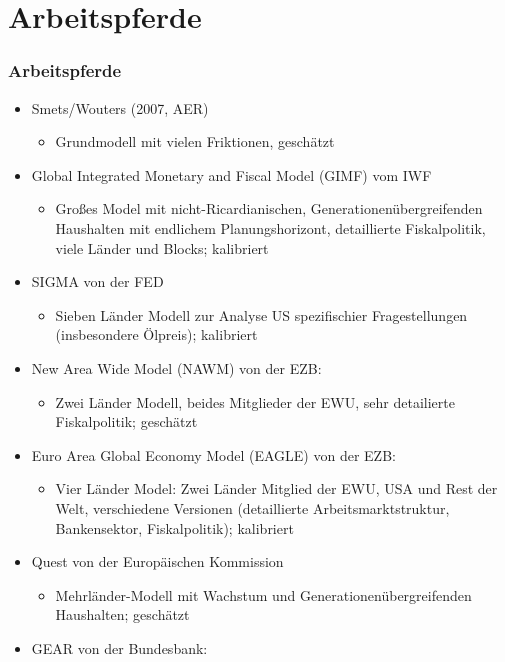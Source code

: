 \documentclass[10pt]{beamer}  %
\begin{document}
\section{Arbeitspferde}
\begin{frame}
\frametitle{Arbeitspferde}\footnotesize
\begin{itemize}
  \item Smets/Wouters (2007, AER)
  \begin{itemize}\tiny
  \item Grundmodell mit vielen Friktionen, gesch\"{a}tzt
  \end{itemize}
  \item Global Integrated Monetary and Fiscal Model (GIMF) vom IWF
  \begin{itemize}\tiny
    \item Gro{\ss}es Model mit nicht-Ricardianischen,  Generationen\"{u}bergreifenden Haushalten mit endlichem Planungshorizont, detaillierte Fiskalpolitik, viele L\"{a}nder und Blocks; kalibriert
  \end{itemize}
\item SIGMA von der FED
\begin{itemize}\tiny
\item Sieben L\"{a}nder Modell zur Analyse US spezifischier Fragestellungen (insbesondere \"{O}lpreis); kalibriert
\end{itemize}
\item New Area Wide Model (NAWM) von der EZB:
\begin{itemize}\tiny
\item Zwei L\"{a}nder Modell, beides Mitglieder der EWU, sehr detailierte Fiskalpolitik; gesch\"{a}tzt
\end{itemize}
\item Euro Area Global Economy Model (EAGLE) von der EZB:
    \begin{itemize}\tiny
    \item Vier L\"{a}nder Model: Zwei L\"{a}nder Mitglied der EWU, USA und Rest der Welt, verschiedene Versionen (detaillierte Arbeitsmarktstruktur, Bankensektor, Fiskalpolitik); kalibriert
    \end{itemize}
\item Quest von der Europ\"{a}ischen Kommission
\begin{itemize}\tiny
    \item Mehrl\"{a}nder-Modell mit Wachstum und Generationen\"{u}bergreifenden Haushalten; gesch\"{a}tzt
\end{itemize}
\item GEAR von der Bundesbank:

\end{itemize}
\end{frame}
\end{document}
